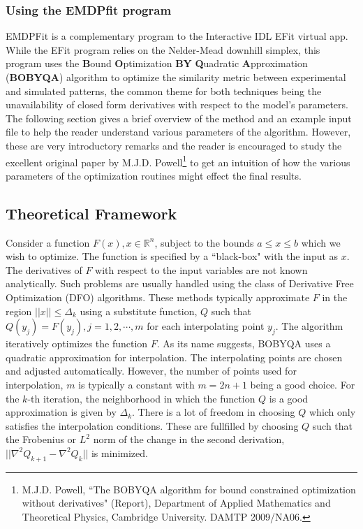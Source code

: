 \documentclass[DIV=calc, paper=letter, fontsize=11pt]{scrartcl}	 %
\begin{document}
\subsubsection{Using the \textsf{EMDPfit} program}
\textsf{EMDPFit} is a complementary program to the Interactive \textsf{IDL} \textsf{EFit} virtual app. While the \textsf{EFit} program relies on the Nelder-Mead downhill simplex, this program uses the \textbf{B}ound \textbf{O}ptimization \textbf{BY} \textbf{Q}uadratic \textbf{A}pproximation (\textbf{BOBYQA}) algorithm to optimize the similarity metric between experimental and simulated patterns, the common theme for both techniques being the unavailability of closed form derivatives with respect to the model's parameters. The following section gives a brief overview of the method and an example input file to help the reader understand various parameters of the algorithm. However, these are very introductory remarks and the reader is encouraged to study the excellent original paper by M.J.D. Powell\footnote{M.J.D. Powell, ``The BOBYQA algorithm for bound constrained optimization without derivatives" (Report), Department of Applied Mathematics and Theoretical Physics, Cambridge University. DAMTP 2009/NA06.} to get an intuition of how the various parameters of the optimization routines might effect the final results.
\subsection{Theoretical Framework}
Consider a function $F(x), x \in \mathbb{R}^{n}$, subject to the bounds $a \le x \le b$ which we wish to optimize. The function is specified by a ``black-box" with the input as $x$. The derivatives of $F$ with respect to the input variables are not known analytically. Such problems are usually handled using the class of Derivative Free Optimization (DFO) algorithms. These methods typically approximate $F$ in the region $||x|| \le \Delta_{k}$ using a substitute function, $Q$ such that $Q(y_{j}) = F(y_{j}), j = 1,2,\cdots ,m$ for each interpolating point $y_{j}$. The algorithm iteratively optimizes the function $F$. As its name suggests, BOBYQA uses a quadratic approximation for interpolation. The interpolating points are chosen and adjusted automatically. However, the number of points used for interpolation, $m$ is typically a constant with $m = 2n+1$ being a good choice. For the $k$-th iteration, the neighborhood in which the function $Q$ is a good approximation is given by $\Delta_{k}$. There is a lot of freedom in choosing $Q$ which only satisfies the interpolation conditions. These are fullfilled by choosing $Q$ such that the Frobenius or $L^{2}$ norm of the change in the second derivation, $||\nabla^{2}Q_{k+1} - \nabla^{2}Q_{k}||$ is minimized. \\
\end{document}
